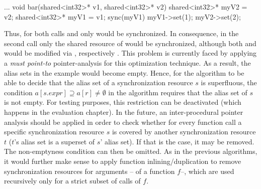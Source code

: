 \begin{ccode}
...
void bar(shared<int32>* v1, shared<int32>* v2) { 
  shared<int32>* myV2 = v2; 
  shared<int32>* myV1 = v1;
  sync(myV1) { 
    myV1->set(1); 
    myV2->set(2); 
  } 
}
\end{ccode}
Thus, for both calls  and  only  would be synchronized. In consequence, in the second call only the shared resource of  would be synchronized, although both  and  would be modified via , respectively . This problem is currently faced by applying a \textit{must point-to} pointer-analysis for this optimization technique. As a result, the alias sets in the example would become empty. Hence, for the algorithm to be able to decide that the alias set of a synchronization resource $s$ is superfluous, the condition $a[s.\mathit{expr}] \supseteq a[r] \neq \emptyset$ in the algorithm requires that the alias set of $s$ is not empty. For testing purposes, this restriction can be deactivated (which happens in the evaluation chapter). In the future, an inter-procedural pointer analysis should be applied in order to check whether for every function call a specific synchronization resource $s$ is covered by another synchronization resource $t$ ($t$'s alias set is a superset of $s$' alias set). If that is the case, it may be removed. The non-emptyness condition can then be omitted. As in the previous algorithms, it would further make sense to apply function inlining/duplication to remove synchronization resources for arguments -- of a function $f$--, which are used recursively only for a strict subset of calls of $f$. 

